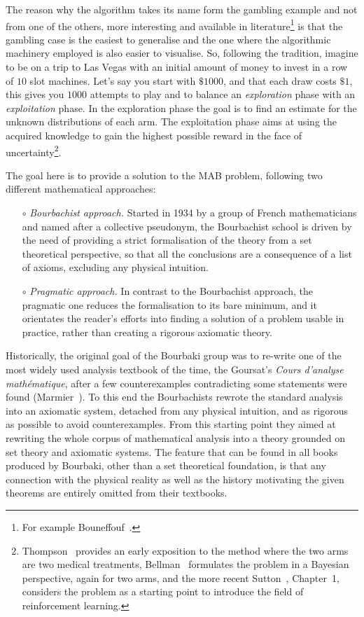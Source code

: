 \documentclass[]{scrartcl}
\theoremstyle{definition}
\begin{document}
The reason why the algorithm takes its name form the gambling example and not from one of the others, more interesting and available in literature\footnote{
    For example Bouneffouf~\cite{bf2019survey}.
    }
is that the gambling case is the easiest to generalise and the one where the algorithmic machinery employed is also easier to visualise.
So, following the tradition, imagine to be on a trip to Las Vegas with an initial amount of money to invest in a row of $10$ slot machines. Let's say you start with $\$1000$, and that each draw costs $\$1$, this gives you $1000$ attempts to play and to balance an \emph{exploration} phase with an \emph{exploitation} phase. In the exploration phase the goal is to find an estimate for the unknown distributions of each arm. The exploitation phase aims at using the acquired knowledge to gain the highest possible reward in the face of uncertainty\footnote{
    Thompson~\cite{thompson1933likelihood} provides an early exposition to the method where the two arms are two medical treatments, Bellman~\cite{bellman1956problem} formulates the problem in a Bayesian perspective, again for two arms, and the more recent Sutton~\cite{sutton2018reinforcement}, Chapter~1, considers the problem as a starting point to introduce the field of reinforcement learning.
}.

The goal here is to provide a solution to the MAB problem, following two different mathematical approaches:
\begin{itemize}
    \item[$\circ$] \emph{Bourbachist approach.} Started in 1934 by a group of French mathematicians and named after a collective pseudonym, the Bourbachist school is driven by the need of providing a strict formalisation of the theory from a set theoretical perspective, so that all the conclusions are a consequence of a list of axioms, excluding any physical intuition.
    \item[$\circ$] \emph{Pragmatic approach.} In contrast to the Bourbachist approach, the pragmatic one reduces the formalisation to its bare minimum, and it orientates the reader's efforts into finding a solution of a problem usable in practice, rather than creating a rigorous axiomatic theory.
\end{itemize}

Historically, the original goal of the Bourbaki group was to re-write one of the most widely used analysis textbook of the time, the Goursat’s \emph{Cours d'analyse mathématique}, after a few counterexamples contradicting some statements were found (Marmier~\cite{marmier2014idea}). To this end the Bourbachists rewrote the standard analysis into an axiomatic system, detached from any physical intuition, and as rigorous as possible to avoid counterexamples. From this starting point they aimed at rewriting the whole corpus of mathematical analysis into a theory grounded on set theory and axiomatic systems. The feature that can be found in all books produced by Bourbaki, other than a set theoretical foundation, is that any connection with the physical reality as well as the history motivating the given theorems are entirely omitted from their textbooks.
\end{document}
